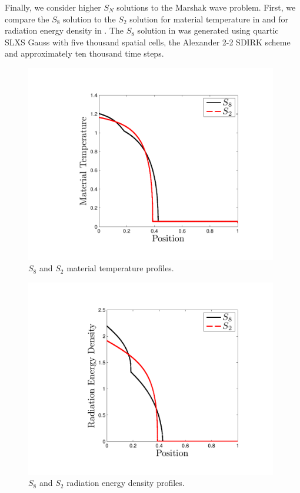 Finally, we consider higher $S_N$ solutions to the Marshak wave problem.  First, we compare the $S_8$ solution to the $S_2$ solution for material temperature in  and for radiation energy density in .  The $S_8$ solution in  was generated using quartic SLXS Gauss with five thousand spatial cells, the Alexander 2-2 SDIRK scheme and approximately ten thousand time steps.
\begin{figure}[!htp]
\centering
\includegraphics[width=11cm,trim=1.0in  0.5in 0.2in 0.6in,clip=true]{chapter6_grey_radtran/S8_vs_S2_Material_Temperature.pdf}
\caption{$S_8$ and $S_2$ material temperature profiles.}
\label{fig:s2_vs_s8_temperature}
\end{figure}
%
\begin{figure}[!htp]
\centering
\includegraphics[width=11cm,trim=1.0in  0.3in 0.2in 0.5in,clip=true]{chapter6_grey_radtran/S8_vs_S2_Radiation_Energy_Density.pdf}
\caption{$S_8$ and $S_2$ radiation energy density profiles.}
\label{fig:s2_vs_s8_radiation}
\end{figure}
